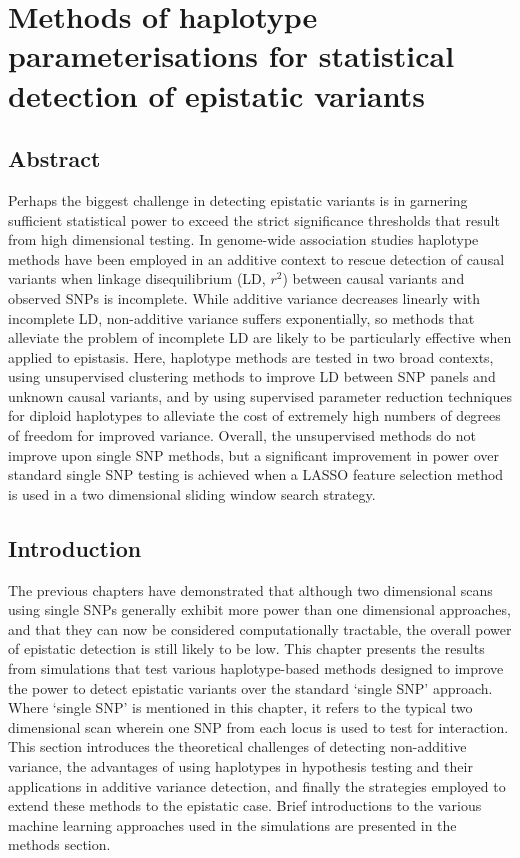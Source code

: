 \chapter{Methods of haplotype parameterisations for statistical detection of epistatic variants}
\label{Results4}

\section{Abstract}
Perhaps the biggest challenge in detecting epistatic variants is in garnering sufficient statistical power to exceed the strict significance thresholds that result from high dimensional testing. In genome-wide association studies haplotype methods have been employed in an additive context to rescue detection of causal variants when linkage disequilibrium (LD, $r^{2}$) between causal variants and observed SNPs is incomplete. While additive variance decreases linearly with incomplete LD, non-additive variance suffers exponentially, so methods that alleviate the problem of incomplete LD are likely to be particularly effective when applied to epistasis. Here, haplotype methods are tested in two broad contexts, using unsupervised clustering methods to improve LD between SNP panels and unknown causal variants, and by using supervised parameter reduction techniques for diploid haplotypes to alleviate the cost of extremely high numbers of degrees of freedom for improved variance. Overall, the unsupervised methods do not improve upon single SNP methods, but a significant improvement in power over standard single SNP testing is achieved when a LASSO feature selection method is used in a two dimensional sliding window search strategy.

\section{Introduction}
The previous chapters have demonstrated that although two dimensional scans using single SNPs generally exhibit more power than one dimensional approaches, and that they can now be considered computationally tractable, the overall power of epistatic detection is still likely to be low. This chapter presents the results from simulations that test various haplotype-based methods designed to improve the power to detect epistatic variants over the standard `single SNP' approach. Where `single SNP' is mentioned in this chapter, it refers to the typical two dimensional scan wherein one SNP from each locus is used to test for interaction. This section introduces the theoretical challenges of detecting non-additive variance, the advantages of using haplotypes in hypothesis testing and their applications in additive variance detection, and finally the strategies employed to extend these methods to the epistatic case. Brief introductions to the various machine learning approaches used in the simulations are presented in the methods section.


